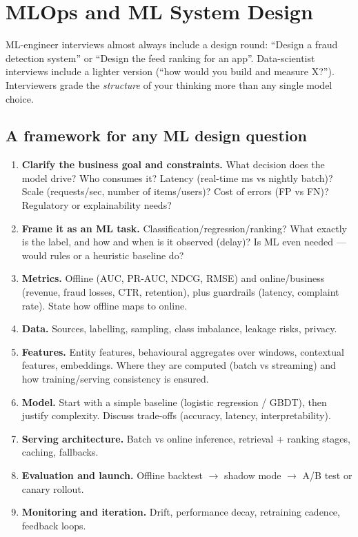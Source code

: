 \chapter{MLOps and ML System Design}

ML-engineer interviews almost always include a design round: ``Design a fraud detection system'' or ``Design the feed ranking for an app''. Data-scientist interviews include a lighter version (``how would you build and measure X?''). Interviewers grade the \emph{structure} of your thinking more than any single model choice.

\section{A framework for any ML design question}
\begin{enumerate}
  \item \textbf{Clarify the business goal and constraints.} What decision does the model drive? Who consumes it? Latency (real-time ms vs nightly batch)? Scale (requests/sec, number of items/users)? Cost of errors (FP vs FN)? Regulatory or explainability needs?
  \item \textbf{Frame it as an ML task.} Classification/regression/ranking? What exactly is the label, and how and when is it observed (delay)? Is ML even needed --- would rules or a heuristic baseline do?
  \item \textbf{Metrics.} Offline (AUC, PR-AUC, NDCG, RMSE) and online/business (revenue, fraud losses, CTR, retention), plus guardrails (latency, complaint rate). State how offline maps to online.
  \item \textbf{Data.} Sources, labelling, sampling, class imbalance, leakage risks, privacy.
  \item \textbf{Features.} Entity features, behavioural aggregates over windows, contextual features, embeddings. Where they are computed (batch vs streaming) and how training/serving consistency is ensured.
  \item \textbf{Model.} Start with a simple baseline (logistic regression / GBDT), then justify complexity. Discuss trade-offs (accuracy, latency, interpretability).
  \item \textbf{Serving architecture.} Batch vs online inference, retrieval + ranking stages, caching, fallbacks.
  \item \textbf{Evaluation and launch.} Offline backtest $\to$ shadow mode $\to$ A/B test or canary rollout.
  \item \textbf{Monitoring and iteration.} Drift, performance decay, retraining cadence, feedback loops.
\end{enumerate}

